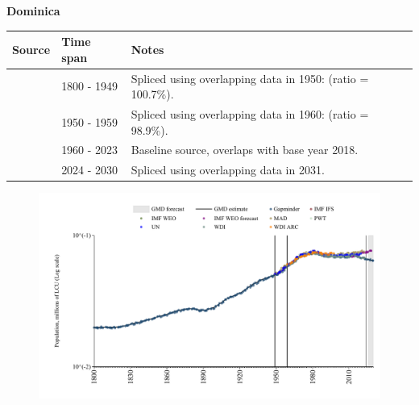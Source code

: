 \documentclass[12pt,a4paper,landscape]{article}
\begin{document}
\begin{adjustbox}{max totalsize={\paperwidth}{\paperheight},center}
\begin{minipage}[t][\textheight][t]{\textwidth}
\vspace*{0.5cm}
{}
\begin{center}
{\Large\bfseries Dominica}
\end{center}
\vspace{0.5cm}
\begin{table}[H]
\centering
\small
\begin{tabular}{|l|l|l|}
\hline
\textbf{Source} & \textbf{Time span} & \textbf{Notes} \\
\hline
\rowcolor{white}\cite{Gapminder}& 1800 - 1949 &Spliced using overlapping data in 1950: (ratio = 100.7\%).\\
\rowcolor{lightgray}\cite{IMF_IFS}& 1950 - 1959 &Spliced using overlapping data in 1960: (ratio = 98.9\%).\\
\rowcolor{white}\cite{WDI}& 1960 - 2023 &Baseline source, overlaps with base year 2018.\\
\rowcolor{lightgray}\cite{Gapminder}& 2024 - 2030 &Spliced using overlapping data in 2031.\\
\hline
\end{tabular}
\end{table}
\begin{figure}[H]
\centering
\includegraphics[width=\textwidth,height=0.6\textheight,keepaspectratio]{graphs/DMA_pop.pdf}
\end{figure}
\end{minipage}
\end{adjustbox}
\end{document}
